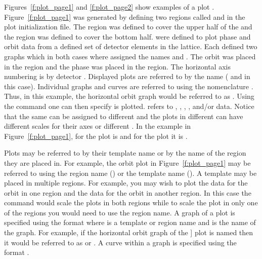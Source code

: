 Figures~\ref{f:plot_page1} and \ref{f:plot_page2} show examples of a
plot . Figure~\ref{f:plot_page1} was generated by defining
two regions called  and  in the plot initialization
file. The  region was defined to cover the upper half of the
 and the  region was defined to cover the bottom
half.  were defined to plot phase and orbit data
from a defined set of detector elements in the lattice. Each
 defined two graphs which in both cases where
assigned the names  and . The orbit  was
placed in the  region and the phase  was
placed in the  region. The horizontal axis numbering is by
detector .  Displayed plots are referred to by the
 name ( and  in this case). Individual
graphs and curves are referred to using the nomenclature
. Thus, in this example, the horizontal orbit graph
would be referred to as .  Using the  command one
can then specify  is plotted.  refers to
, , , , and/or
 data.  Notice that the same  can be
assigned to different  and the plots in different
 can have different scales for their axes or different
. In the example in Figure~\ref{f:plot_page1},  for
the  plot is  and for the  plot it is
.

Plots may be referred to by their template name or by the name of the 
region they are placed in. For example, the orbit plot in 
Figure~\ref{f:plot_page1} may be referred to using the region name ()
or the template name (). A template may be placed in multiple regions.
For example, you may wish to plot the  data for the orbit in one
region and the   data for the orbit in another region. In this case 
the command  would scale the plots in both regions while to scale
the plot in only one of the regions you would need to use the region name. A graph
of a plot is specified using the format  where 
is a template or region name and  is the name of the graph. For example,
if the horizontal orbit graph of the ] plot is named  then it would
be referred to as  or . A curve
within a graph is specified using the format .

